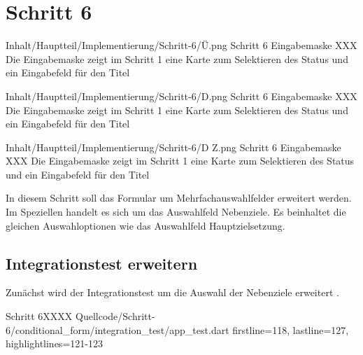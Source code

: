 \ifincludeall \clearpage \fi

\section{Schritt 6}


\begin{alexfigure}{Inhalt/Hauptteil/Implementierung/Schritt-6/Ü.png}
  {Schritt 6 Eingabemaske}
  {XXX Die Eingabemaske zeigt im Schritt 1 eine Karte zum Selektieren des Status und ein Eingabefeld für den Titel}

  \label{fig:Schritt4Eingabemaske}

\end{alexfigure}

\begin{alexfigure}{Inhalt/Hauptteil/Implementierung/Schritt-6/D.png}
  {Schritt 6 Eingabemaske}
  {XXX Die Eingabemaske zeigt im Schritt 1 eine Karte zum Selektieren des Status und ein Eingabefeld für den Titel}

  \label{fig:Schritt4Eingabemaske}

\end{alexfigure}


\begin{alexfigure}{Inhalt/Hauptteil/Implementierung/Schritt-6/D Z.png}
  {Schritt 6 Eingabemaske}
  {XXX Die Eingabemaske zeigt im Schritt 1 eine Karte zum Selektieren des Status und ein Eingabefeld für den Titel}

  \label{fig:Schritt4Eingabemaske}

\end{alexfigure}

In diesem Schritt soll das Formular um Mehrfachauswahlfelder erweitert werden.
Im Speziellen handelt es sich um das Auswahlfeld Nebenziele.
Es beinhaltet die gleichen Auswahloptionen wie das Auswahlfeld Hauptzielsetzung.

\subsection{Integrationstest erweitern}

Zunächst wird der Integrationstest um die Auswahl der Nebenziele erweitert \Lst{\ref{lst:Schritt6tabSelectionCard}}.

\begin{alexlisting}{Schritt 6}{XXXX}
  {Quellcode/Schritt-6/conditional_form/integration_test/app_test.dart}
  {firstline=118, lastline=127, highlightlines={121-123}}
  \label{lst:Schritt6tabSelectionCard}
\end{alexlisting}

